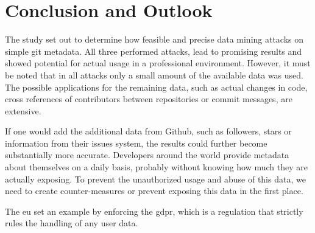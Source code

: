 \chapter{Conclusion and Outlook}

The study set out to determine how feasible and precise data mining attacks on simple git metadata.
All three performed attacks, lead to promising results and showed potential for actual usage in a professional environment.
However, it must be noted that in all attacks only a small amount of the available data was used.
The possible applications for the remaining data, such as actual changes in code, cross references of contributors between repositories or commit messages, are extensive.

If one would add the additional data from Github, such as followers, stars or information from their issues system, the results could further become substantially more accurate.
Developers around the world provide metadata about themselves on a daily basis, probably without knowing how much they are actually exposing.
To prevent the unauthorized usage and abuse of this data, we need to create counter-measures or prevent exposing this data in the first place.

The \ac{eu} set an example by enforcing the \ac{gdpr}, which is a regulation that strictly rules the handling of any user data.
